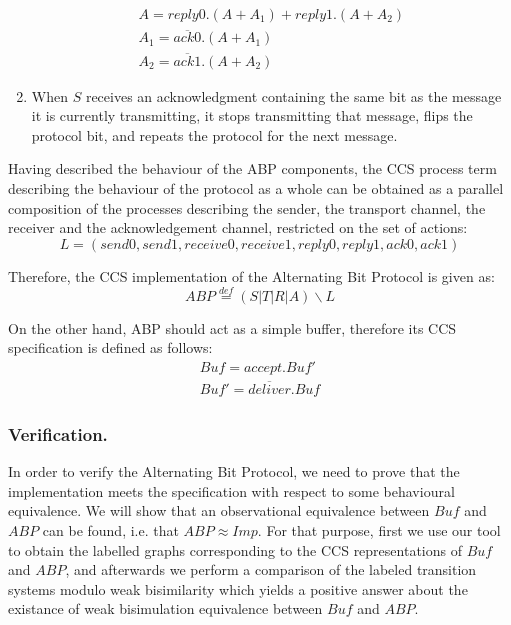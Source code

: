 \begin{enumerate}
        \begin{equation*}\label{trans_imp}
	      	\begin{array}{lcl}
						A=reply0.\left(A+A_{1}\right)+reply1.\left(A+A_{2}\right)\\
						A_{1}=\overline{ack0}.\left(A+A_{1}\right)\\
						A_{2}=\overline{ack1}.\left(A+A_{2}\right)
					\end{array}
				\end{equation*}
  \item When $S$ receives an acknowledgment containing the same bit as the message it is currently transmitting, it stops transmitting that message, flips the protocol bit, and repeats the protocol for the next message.\cite{Kulick}\cite{ProcessAlgebraParallel}
\end{enumerate}

Having described the behaviour of the ABP components, the CCS process term describing the behaviour of the protocol as a whole can be obtained as a parallel composition of the processes describing the sender, the transport channel, the receiver and the acknowledgement channel, restricted on the set of actions:
\begin{equation*}
  L = \left(send0,send1,receive0,receive1,reply0,reply1,ack0,ack1\right)
\end{equation*}

Therefore, the CCS implementation of the Alternating Bit Protocol is given as:
\begin{equation}\label{abp_imp}
	\mathit{ABP} \stackrel{def}{=}\left(S|T|R|A\right)\backslash L
\end{equation}

On the other hand, ABP should act as a simple buffer, therefore its CCS specification is defined as follows:
\begin{equation}\label{eq:abp_spec}
	\begin{array}{lcl}
		\mathit{Buf} = \mathit{accept.Buf'}\\
		\mathit{Buf'} = \mathit{\overline{deliver}.Buf}
	\end{array}
\end{equation}

\subsubsection{Verification.} In order to verify the Alternating Bit Protocol, we need to prove that the implementation meets the specification with respect to some behavioural equivalence. We will show that an observational equivalence between $\mathit{Buf}$ and $\mathit{ABP}$ can be found, i.e. that $\mathit{ABP}\approx \mathit{Imp}$. For that purpose, first we use our tool to obtain the labelled graphs corresponding to the CCS representations of $\mathit{Buf}$ and $\mathit{ABP}$, and afterwards we perform a comparison of the labeled transition systems modulo weak bisimilarity which yields a positive answer about the existance of weak bisimulation equivalence between $\mathit{Buf}$ and $\mathit{ABP}$.

